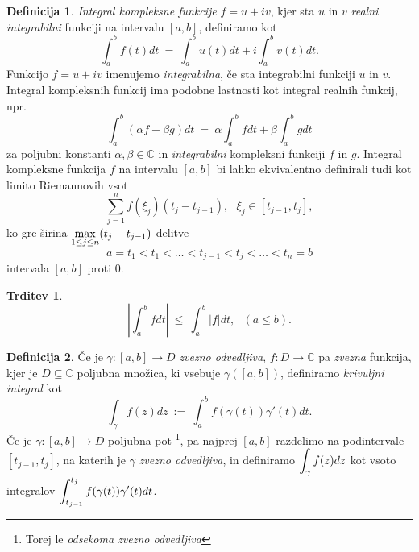 \documentclass[11pt]{article}
\theoremstyle{definition}
\newtheorem{definicija}{Definicija}[section]
\theoremstyle{definition}
\newtheorem{trditev}{Trditev}[section]
\theoremstyle{definition}
\begin{document}
\begin{definicija}

\textit{Integral kompleksne funkcije} $f = u + iv$, kjer sta $u$ in $v$ \textit{realni integrabilni} funkciji na intervalu $[a, b]$, definiramo kot
$$\int_a^b f(t) dt ~=~ \int_a^b u(t) dt + i\int_a^b v(t) dt.$$
Funkcijo $f = u + iv$ imenujemo \textit{integrabilna}, če sta integrabilni funkciji $u$ in $v$. \\

\noindent Integral kompleksnih funkcij ima podobne lastnosti kot integral realnih funkcij, npr.
$$\int_a^b \left( \alpha f + \beta g \right) dt ~=~ \alpha \int_a^b f dt + \beta \int_a^b g dt$$
za poljubni konstanti $\alpha, \beta \in \mathbb{C}$ in \textit{integrabilni} kompleksni funkciji $f$ in $g$. Integral kompleksne funkcija $f$ na intervalu $[a, b]$ bi lahko ekvivalentno definirali tudi kot limito Riemannovih vsot 
$$\sum_{j=1}^n f(\xi_j)(t_j - t_{j-1}), ~~~\xi_j \in [t_{j-1}, t_j],$$
ko gre širina $\mathlarger{\max_{1 \leq j \leq n}(t_j - t_{j-1})}$ delitve 
$$a = t_1 < t_1 < \ldots < t_{j-1} < t_j < \ldots < t_n = b$$
 intervala $[a, b]$ proti $0$.

\end{definicija}
\vspace{0.5cm}

\begin{trditev}

$$\left| \int_a^b f dt \right| ~\leq~ \int_a^b |f| dt, ~~~(a \leq b).$$

\end{trditev}
\vspace{0.5cm}

\begin{definicija}

Če je $\gamma: [a, b] \rightarrow D$ \textit{zvezno odvedljiva}, $f: D \rightarrow \mathbb{C}$ pa \textit{zvezna} funkcija, kjer je $D \subseteq \mathbb{C}$ poljubna množica, ki vsebuje $\gamma([a, b])$, definiramo \textit{krivuljni integral} kot
$$\int_{\gamma} f(z) dz ~:=~ \int_a^b f(\gamma(t)) \gamma'(t) dt.$$
Če je $\gamma: [a, b] \rightarrow D$ poljubna pot \footnote{Torej le \textit{odsekoma zvezno odvedljiva}}, pa najprej $[a, b]$ razdelimo na podintervale $[t_{j-1}, t_j]$, na katerih je $\gamma$ \textit{zvezno odvedljiva}, in definiramo $\mathlarger{\int_{\gamma} f(z) dz}$ kot vsoto integralov $\mathlarger{\int_{t_{j-1}}^{t_j} f(\gamma(t))\gamma'(t) dt}$.

\end{definicija}
\vspace{0.5cm}
\end{document}

